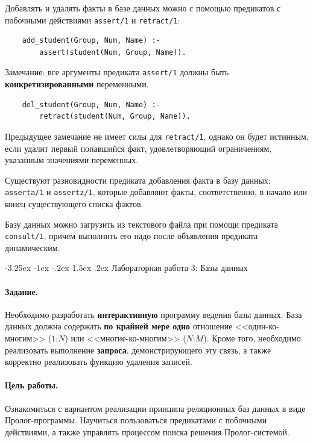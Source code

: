 \documentclass[12pt, openany, twoside]{book} %
\makeatletter
\renewcommand\section{\@startsection {section}{1}{\z@}%
                                   {-3.25ex \@plus -1ex \@minus -.2ex}%
                                   {1.5ex \@plus.2ex}%
                                   {\normalfont\large\bfseries}}
\makeatother
\begin{document}
Добавлять и удалять факты в базе данных можно с помощью предикатов с побочными действиями {\tt assert/1} и {\tt retract/1}:

{\tt\begin{verbatim}
    add_student(Group, Num, Name) :-
        assert(student(Num, Group, Name)).
\end{verbatim}}

\noindent Замечание: все аргументы предиката {\tt assert/1} должны быть {\bf конкретизированными} переменными.

{\tt\begin{verbatim}
    del_student(Group, Num, Name) :-
        retract(student(Num, Group, Name)).
\end{verbatim}}
\noindent Предыдущее замечание не имеет силы для {\tt retract/1}, однако он будет истинным, если удалит первый попавшийся факт, удовлетворяющий ограничениям, указанным значениями переменных.

Существуют разновидности предиката добавления факта в базу данных: {\tt asserta/1} и {\tt assertz/1}, которые добавляют факты, соответственно, в начало или конец существующего списка фактов.

Базу данных можно загрузить из текстового файла при помощи предиката {\tt consult/1}, причем выполнить его надо после объявления предиката динамическим.

\section{Лабораторная работа 3: Базы данных}
\paragraph{Задание.} Необходимо разработать {\bf интерактивную} программу ведения базы данных. База данных должна содержать {\bf по крайней мере одно} отношение <<один-ко-многим>> ($1$:$N$) или <<многие-ко-многим>> ($N$:$M$). Кроме того, необходимо реализовать выполнение {\bf запроса}, демонстрирующего эту связь, а также корректно реализовать функцию удаления записей.

\paragraph{Цель работы.} Ознакомиться с вариантом реализации принципа реляционных баз данных в виде Пролог-программы. Научиться пользоваться предикатами с побочными действиями, а также управлять процессом поиска решения Пролог-системой.
\end{document}
